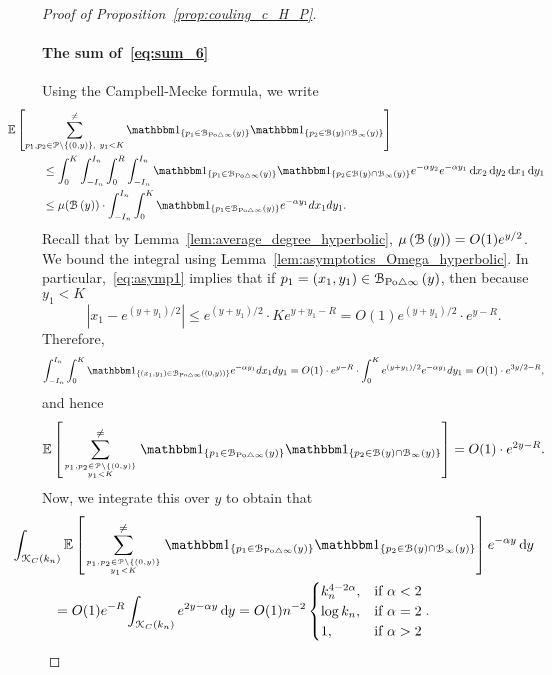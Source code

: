 \begin{proof}[Proof of Proposition~\ref{prop:couling_c_H_P}]
\paragraph{The sum of~\eqref{eq:sum_6}}
Using the Campbell-Mecke formula, we write 
\begin{align*}
	&\hspace{-30pt}\Exp { \sum_{p_1,p_2 \in\Pcal \setminus \{(0,y)\}, \ y_1 < K}^{\ne}
		\ind{p_1\in \BallSym{y}} \ind{p_2\in \BallHyp{y}\cap \BallPo{y}}}\\
	&\leq  \int_0^K \int_{-I_n}^{I_n}  \int_0^{R} \int_{-I_n}^{I_n}
		\ind{p_1 \in \BallSym{y}} 
 		\ind{p_2 \in \BallHyp{y}\cap \BallPo{y}} e^{-\alpha y_2} e^{-\alpha y_1} \dd x_2 \dd y_2 \dd x_1 \dd y_1  \\
 	&\leq  \mu (\BallHyp{y})\cdot \int_{-I_n}^{I_n} \int_0^K \ind{p_1 \in \BallSym{y}} 
		e^{-\alpha y_1}  dx_1 dy_1.
\end{align*}
Recall that by Lemma~\ref{lem:average_degree_hyperbolic}, $\mu\left({\mathcal B}\left(y\right)\right) =O(1) e^{y/2}$. We bound the integral using Lemma~\ref{lem:asymptotics_Omega_hyperbolic}. In particular,~\eqref{eq:asymp1} implies that if $p_1 = (x_1,y_1) \in {\mathcal B}_{{\mathrm{Po}} \bigtriangleup \infty}\left(y\right)$, then because $y_1 < K$
\[
	|x_1 - e^{(y+y_1)/2} |\leq e^{(y+y_1)/2} \cdot K e^{y+y_1- R} = O(1) 
	e^{(y+y_1)/2} \cdot e^{y- R}.
\]
Therefore, 
\[
	\int_{-I_n}^{I_n} \int_0^K \ind{(x_1,y_1) \in \BallSym{(0,y)}} 
	e^{-\alpha y_1}  dx_1 dy_1 = O(1) \cdot e^{y-R} 
	\cdot \int_0^K e^{(y+y_1)/2} 
	e^{-\alpha y_1}   dy_1 = O(1)\cdot e^{3y/2 - R}, 
\]
and hence
\begin{align*}
	\Exp { \sum_{p_1,p_2 \in\Pcal \setminus \{(0,y)\} \atop y_1 < K}^{\ne}
	\ind{p_1\in \BallSym{y}} \ind{p_2\in \BallHyp{y}\cap \BallPo{y}}} 
	= O(1) \cdot e^{2y - R}.
\end{align*}
Now, we integrate this over $y$ to obtain that
\begin{align*}
	&\hspace{-30pt}\int_{\Kcal_{C}(k_n)} \Exp { \sum_{p_1,p_2 \in\Pcal \setminus \{(0,y)\} \atop y_1 < K}^{\ne}
		\ind{p_1\in \BallSym{y}} \ind{p_2\in \BallHyp{y}\cap \BallPo{y}}} e^{-\alpha y} \dd y\\
	&= O(1) e^{-R} \int_{\Kcal_{C}(k_n)} e^{2y -\alpha y} \dd y
		= O(1) n^{-2}
			\begin{cases}
			k_n^{4-2\alpha}, & \mbox{if $\alpha < 2$} \\
			\log k_n, & \mbox{if $\alpha =2$} \\
			1, & \mbox{if $\alpha >2$}
			\end{cases}.
\end{align*}


\end{proof}
